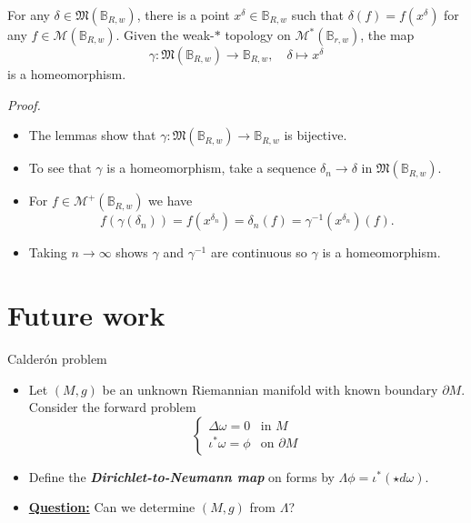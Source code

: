 \documentclass[aspectratio=169]{beamer}
\newcommand\boldgreen[1]{\textcolor{lighter_csu_green}{\emph{\textbf{#1}}}}
\newcommand{\characters}{\mathfrak{M}}
\newcommand{\monogenics}{\mathcal{M}}
\newcommand{\dualmonogenics}{\mathcal{M}^*}
\newcommand{\ball}{\mathbb{B}}
\begin{document}
\begin{frame}{}
\vfill
\begin{theorem}
For any $\delta \in \characters(\ball_{R,w})$, there is a point $x^\delta \in \ball_{R,w}$ such that $\delta(f)=f(x^\delta)$ for any $f\in \monogenics(\ball_{R,w})$. Given the weak-$\ast$ topology on $\dualmonogenics(\ball_{r,w})$, the map
\[
\gamma \colon \characters(\ball_{R,w}) \to \ball_{R,w}, \quad \delta \mapsto x^\delta
\]
is a homeomorphism.
\end{theorem}
\vfill
\end{frame}

\begin{frame}{}
\vfill
\emph{Proof.}
\begin{itemize}
\pause
\item The lemmas show that $\gamma \colon \characters(\ball_{R,w}) \to \ball_{R,w}$ is bijective. 
\pause
\item To see that $\gamma$ is a homeomorphism, take a sequence $\delta_n \to \delta$ in $\characters(\ball_{R,w})$.
\pause
\item For $f\in \monogenics^+(\ball_{R,w})$ we have
\[
f(\gamma(\delta_n))=f(x^{\delta_n})=\delta_n(f)=\gamma^{-1}(x^{\delta_n})(f).
\]
\vspace*{-0.1cm}
\pause
\item Taking $n\to \infty$ shows $\gamma$ and $\gamma^{-1}$ are continuous so $\gamma$ is a homeomorphism.
\end{itemize}
\vfill
\end{frame}

\section{Future work}

\begin{frame}{Calder\'on problem}
\vfill
\begin{itemize}
\pause
\item Let $(M,g)$ be an unknown Riemannian manifold with known boundary $\partial M$. Consider the forward problem
\[
\begin{cases}
\Delta \omega = 0 & \textrm{in $M$}\\
\iota^*\omega = \phi & \textrm{on $\partial M$}
\end{cases}
\]
\pause
\item Define the \boldgreen{Dirichlet-to-Neumann map} on forms by $\Lambda\phi = \iota^*(\star d \omega)$. 
\pause
\item \textbf{\underline{Question:}} Can we determine $(M,g)$ from $\Lambda$?
\end{itemize}
\vfill
\end{frame}
\end{document}
